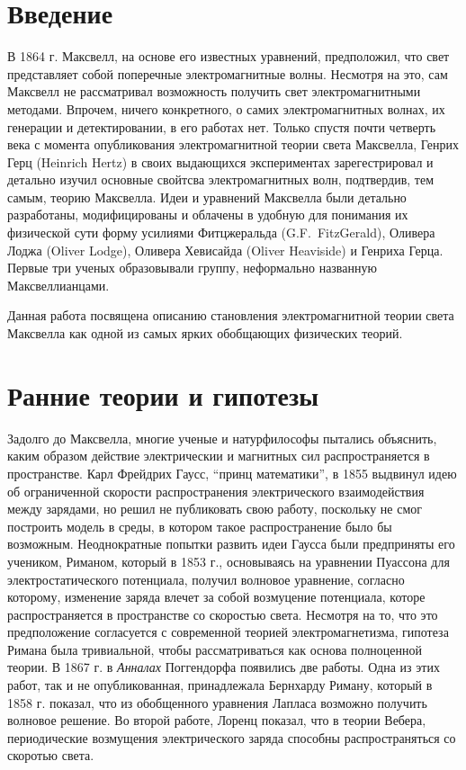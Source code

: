 \documentclass[12pt, oneside, a4paper]{article}
\begin{document}
\section*{Введение}
В 1864 г. Максвелл, на основе его известных уравнений, предположил, что свет представляет собой поперечные электромагнитные волны. Несмотря на это, сам Максвелл не рассматривал возможность получить свет электромагнитными методами. Впрочем, ничего конкретного, о самих электромагнитных волнах, их генерации и детектировании, в его работах нет. Только спустя почти четверть века с момента опубликования электромагнитной теории света Максвелла, Генрих Герц (Heinrich Hertz) в своих выдающихся  экспериментах зарегестрировал и детально изучил основные свойтсва электромагнитных волн, подтвердив, тем самым, теорию Максвелла. Идеи и уравнений  Максвелла были детально разработаны, модифицированы и облачены в удобную для понимания их физической сути форму усилиями Фитцжеральда (G.F.~FitzGerald), Оливера Лоджа (Oliver Lodge), Оливера Хевисайда (Oliver Heaviside) и Генриха Герца. Первые три ученых образовывали группу, неформально названную Максвеллианцами. 

Данная работа посвящена описанию становления электромагнитной теории света Максвелла как одной из самых ярких обобщающих физических теорий.
\section*{Ранние теории и гипотезы}
Задолго до Максвелла, многие ученые и натурфилософы пытались объяснить, каким образом действие электрическии и магнитных  сил распространяется в пространстве. Карл Фрейдрих Гаусс, ``принц математики'', в 1855 выдвинул идею об ограниченной скорости распространения электрического взаимодействия между зарядами, но решил не публиковать свою работу, поскольку не смог построить модель в среды, в котором такое распространение было бы возможным. Неоднократные попытки развить идеи Гаусса были предприняты его учеником, Риманом, который в 1853 г., основываясь на уравнении Пуассона для электростатического потенциала, получил волновое уравнение, согласно которому, изменение заряда влечет за собой возмуцение потенциала, которе распространяется в пространстве со скоростью света. Несмотря на то, что это предположение согласуется с современной теорией электромагнетизма, гипотеза Римана была тривиальной, чтобы рассматриваться как основа полноценной теории. В 1867 г. в \emph{Анналах} Поггендорфа появились две работы. Одна из этих работ, так и не опубликованная, принадлежала Бернхарду Риману, который в 1858 г. показал, что из обобщенного уравнения Лапласа возможно получить волновое решение. Во второй работе, Лоренц показал, что в теории Вебера, периодические возмущения электрического заряда способны распространяться со скоротью света.
\end{document}
